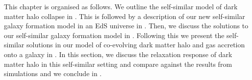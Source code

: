 This chapter is organised as follows. We outline the self-similar model of dark matter halo collapse in . This is followed by a description of our new self-similar galaxy formation model in an EdS universe in . Then, we discuss the solutions to our self-similar galaxy formation model in . Following this we present the self-similar solutions in our model of co-evolving dark matter halo and gas accretion onto a galaxy in . In this section, we discuss the relaxation response of dark matter halo in this self-similar setting and compare against the results from simulations and we conclude in .





